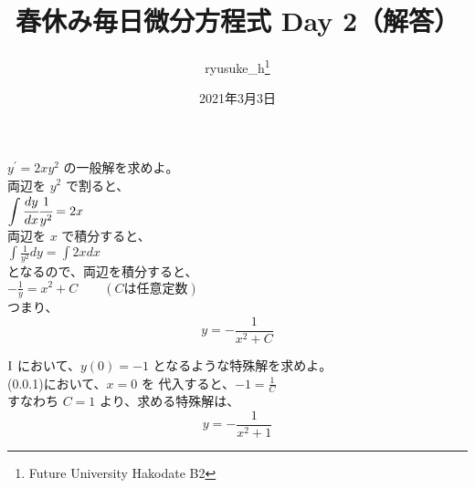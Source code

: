 \documentclass[a4j]{jsarticle}
\title{春休み毎日微分方程式 Day 2（解答）}
\author{ryusuke\_h\thanks{Future University Hakodate B2}}
\date{2021年3月3日}
\begin{document}
\begin{spacing}{1.6}
\maketitle

\begin{qparts}
    \qpart $ y ^ {\prime} = 2xy ^ 2 $ の一般解を求めよ。\\
    両辺を $ y ^ 2 $ で割ると、\\
    $ \displaystyle \int \cfrac{dy}{dx} \cfrac{1}{y ^ 2} = 2x $ \\
    両辺を $ x $ で積分すると、\\
    $ \displaystyle \int \frac{1}{y ^ 2}dy = \int 2xdx $ \\
    となるので、両辺を積分すると、\\
    $ \displaystyle -\frac{1}{y} = x ^ 2 + C \qquad (Cは任意定数) $ \\
    つまり、
    \begin{equation}
      y = -\frac{1}{x ^ 2 + C} \nonumber
    \end{equation}

    \qpart $\rm I $ において、$ y(0) = -1 $ となるような特殊解を求めよ。\\
    (0.0.1)において、$ x = 0 $ を 代入すると、$ \displaystyle -1 = \frac{1}{C}$ \\
    すなわち $ C = 1$ より、求める特殊解は、
    \begin{equation}
      y = -\frac{1}{x ^ 2 + 1} \nonumber
    \end{equation}
\end{qparts}
\end{spacing}
\end{document}

